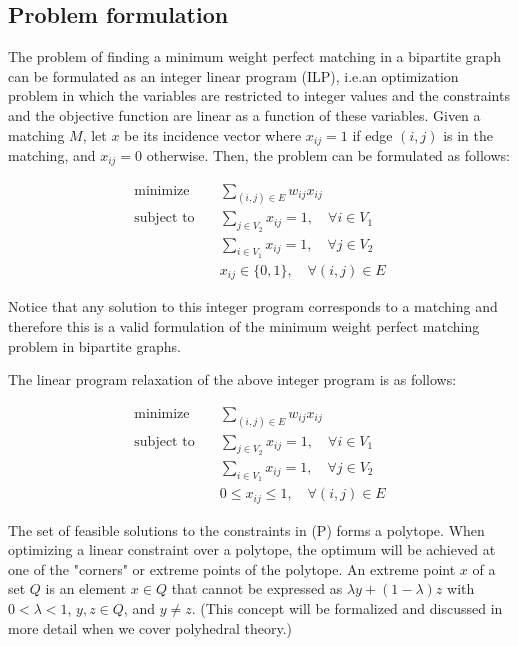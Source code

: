 \subsection{Problem formulation}
The problem of finding a minimum weight perfect matching in a bipartite graph can be formulated as an integer linear program (ILP), i.e.an optimization problem in which the variables are restricted to integer values and the constraints and the objective function are linear as a function of these variables. Given a matching $M$, let $x$ be its incidence vector where $x_{ij} = 1$ if edge $(i, j)$ is in the matching, and $x_{ij} = 0$ otherwise. Then, the problem can be formulated as follows:

\begin{equation}
    \begin{aligned}
        \text{minimize} \quad & \sum_{(i, j) \in E} w_{ij} x_{ij} \\
        \text{subject to} \quad & \sum_{j \in V_2} x_{ij} = 1, \quad \forall i \in V_1 \\
        & \sum_{i \in V_1} x_{ij} = 1, \quad \forall j \in V_2 \\
        & x_{ij} \in \{0, 1\}, \quad \forall (i, j) \in E
    \end{aligned}
\end{equation}

Notice that any solution to this integer program corresponds to a matching and therefore this is a valid formulation of the minimum weight perfect matching problem in bipartite graphs.

The linear program relaxation of the above integer program is as follows:

\begin{equation}
    \begin{aligned}
        \text{minimize} \quad & \sum_{(i, j) \in E} w_{ij} x_{ij} \\
        \text{subject to} \quad & \sum_{j \in V_2} x_{ij} = 1, \quad \forall i \in V_1 \\
        & \sum_{i \in V_1} x_{ij} = 1, \quad \forall j \in V_2 \\
        & 0 \leq x_{ij} \leq 1, \quad \forall (i, j) \in E
    \end{aligned}
\end{equation}

The set of feasible solutions to the constraints in (P) forms a polytope. When optimizing a linear constraint over a polytope, the optimum will be achieved at one of the "corners" or extreme points of the polytope. An extreme point $x$ of a set $Q$ is an element $x \in Q$ that cannot be expressed as $\lambda y + (1 - \lambda) z$ with $0 < \lambda < 1$, $y, z \in Q$, and $y \neq z$. (This concept will be formalized and discussed in more detail when we cover polyhedral theory.)

